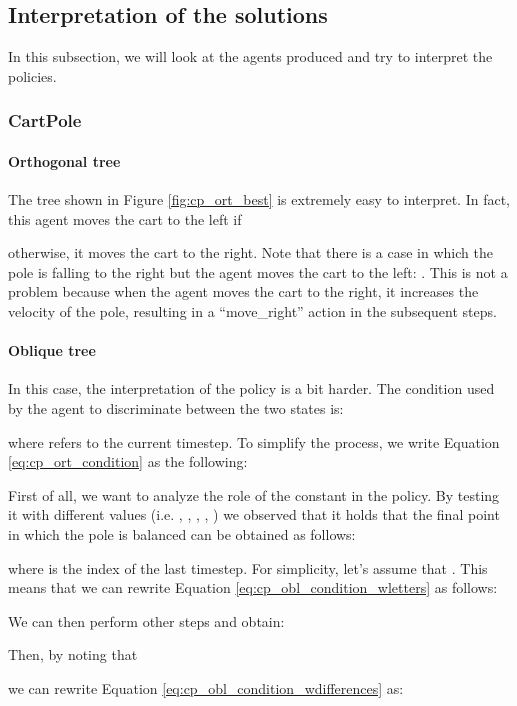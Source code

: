 \documentclass[review,english]{elsarticle}
\begin{document}
\subsection{Interpretation of the solutions}
In this subsection, we will look at the agents produced and try to interpret the policies.

\subsubsection{CartPole}
\paragraph{Orthogonal tree}
The tree shown in Figure \ref{fig:cp_ort_best} is extremely easy to interpret.
In fact, this agent moves the cart to the left if 

otherwise, it moves the cart to the right.
Note that there is a case in which the pole is falling to the right but the agent moves the cart to the left: .
This is not a problem because when the agent moves the cart to the right, it increases the velocity of the pole, resulting in a ``move\_right'' action in the subsequent steps.

\paragraph{Oblique tree}
In this case, the interpretation of the policy is a bit harder.
The condition used by the agent to discriminate between the two states is:

where  refers to the current timestep.
To simplify the process, we write Equation \ref{eq:cp_ort_condition} as the following:


First of all, we want to analyze the role of the constant  in the policy.
By testing it with different values (i.e. , , , , ) we observed that it holds that the final point in which the pole is balanced can be obtained as follows:

where  is the index of the last timestep.
For simplicity, let's assume that .
This means that we can rewrite Equation \ref{eq:cp_obl_condition_wletters} as follows:

We can then perform other steps and obtain:




Then, by noting that

we can rewrite Equation \ref{eq:cp_obl_condition_wdifferences} as:
\end{document}
